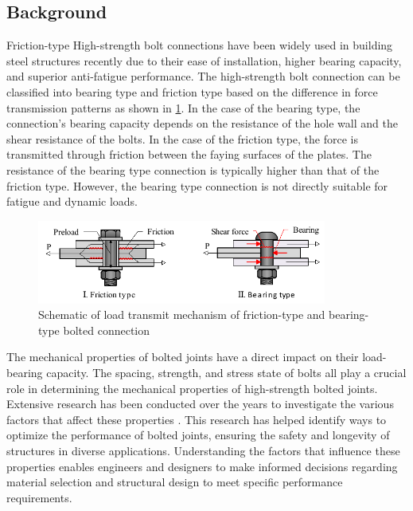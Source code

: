 \subsection{Background}

Friction-type High-strength bolt connections have been widely used in building steel structures recently due to their ease of installation, higher bearing capacity, and superior anti-fatigue performance. The high-strength bolt connection can be classified into bearing type and friction type based on the difference in force transmission patterns as shown in \ref{fig-fricandbearing}. In the case of the bearing type, the connection's bearing capacity depends on the resistance of the hole wall and the shear resistance of the bolts. In the case of the friction type, the force is transmitted through friction between the faying surfaces of the plates. The resistance of the bearing type connection is typically higher than that of the friction type. However, the bearing type connection is not directly suitable for fatigue and dynamic loads.

\begin{figure}[htbp]
    \centering
    \includegraphics[width=0.85\textwidth]{imgs/ch2/fricandbearing.pdf}
    \caption{Schematic of load transmit mechanism of friction-type and bearing-type bolted connection}
    \label{fig-fricandbearing}
\end{figure}

The mechanical properties of bolted joints have a direct impact on their load-bearing capacity. The spacing, strength, and stress state of bolts all play a crucial role in determining the mechanical properties of high-strength bolted joints. Extensive research has been conducted over the years to investigate the various factors that affect these properties \cite{peng2015,Lyu2019NumericalSteels,Brian1996EdgeOcnnections,wang2020interface,hirashima2004experimental}. This research has helped identify ways to optimize the performance of bolted joints, ensuring the safety and longevity of structures in diverse applications. Understanding the factors that influence these properties enables engineers and designers to make informed decisions regarding material selection and structural design to meet specific performance requirements.

